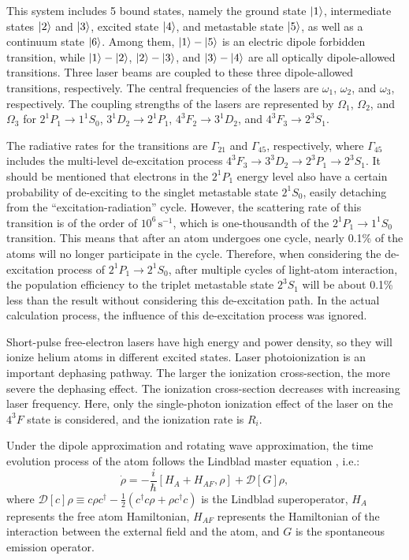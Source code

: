 \documentclass[12pt,a4paper]{article}
\begin{document}
This system includes 5 bound states, namely the ground state $\ket{1}$, intermediate states $\ket{2}$ and $\ket{3}$, excited state $\ket{4}$, and metastable state $\ket{5}$, as well as a continuum state $\ket{6}$. Among them, $\ket{1} - \ket{5}$ is an electric dipole forbidden transition, while $\ket{1} - \ket{2}$, $\ket{2} - \ket{3}$, and $\ket{3} - \ket{4}$ are all optically dipole-allowed transitions. Three laser beams are coupled to these three dipole-allowed transitions, respectively. The central frequencies of the lasers are $\omega_1$, $\omega_2$, and $\omega_3$, respectively. The coupling strengths of the lasers are represented by $\Omega_1$, $\Omega_2$, and $\Omega_3$ for $2^1P_1 \rightarrow 1^1S_0$, $3^1D_2 \rightarrow 2^1P_1$, $4^3F_2 \rightarrow 3^1D_2$, and $4^3F_3 \rightarrow 2^3S_1$.

The radiative rates for the transitions are $\Gamma_{21}$ and $\Gamma_{45}$, respectively, where $\Gamma_{45}$ includes the multi-level de-excitation process $4^3F_3 \rightarrow 3^3D_2 \rightarrow 2^3P_1 \rightarrow 2^3S_1$. It should be mentioned that electrons in the $2^1P_1$ energy level also have a certain probability of de-exciting to the singlet metastable state $2^1S_0$, easily detaching from the ``excitation-radiation'' cycle. However, the scattering rate of this transition is of the order of $10^6 \, \text{s}^{-1}$, which is one-thousandth of the $2^1P_1 \rightarrow 1^1S_0$ transition. This means that after an atom undergoes one cycle, nearly 0.1\% of the atoms will no longer participate in the cycle. Therefore, when considering the de-excitation process of $2^1P_1 \rightarrow 2^1S_0$, after multiple cycles of light-atom interaction, the population efficiency to the triplet metastable state $2^3S_1$ will be about 0.1\% less than the result without considering this de-excitation path. In the actual calculation process, the influence of this de-excitation process was ignored.

Short-pulse free-electron lasers have high energy and power density, so they will ionize helium atoms in different excited states. Laser photoionization is an important dephasing pathway. The larger the ionization cross-section, the more severe the dephasing effect. The ionization cross-section decreases with increasing laser frequency. Here, only the single-photon ionization effect of the laser on the $4^3F$ state is considered, and the ionization rate is $R_i$.

Under the dipole approximation and rotating wave approximation, the time evolution process of the atom follows the Lindblad master equation \cite{ref43}, i.e.:
\begin{equation}
\dot{\rho} = -\frac{i}{\hbar}[H_A + H_{AF}, \rho] + \mathcal{D}[G]\rho,
\end{equation}
where $\mathcal{D}[c]\rho \equiv c\rho c^\dagger - \frac{1}{2}(c^\dagger c \rho + \rho c^\dagger c)$ is the Lindblad superoperator, $H_A$ represents the free atom Hamiltonian, $H_{AF}$ represents the Hamiltonian of the interaction between the external field and the atom, and $G$ is the spontaneous emission operator.
\end{document}
